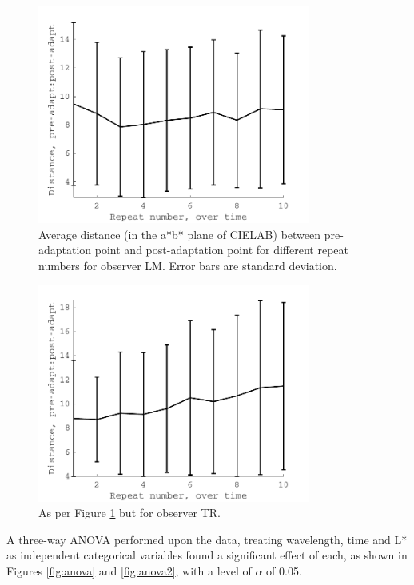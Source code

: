 \begin{figure}[htbp]
\includegraphics[max width=0.8\textwidth]{figs/LargeSphere/LMCCI_T.pdf}
\caption{Average distance (in the a*b* plane of CIELAB) between pre-adaptation point and post-adaptation point for different repeat numbers for observer LM. Error bars are standard deviation.}
\label{fig:LMCCI_T}
\end{figure}

\begin{figure}[htbp]
\includegraphics[max width=0.8\textwidth]{figs/LargeSphere/TRCCI_T.pdf}
\caption{As per Figure \ref{fig:LMCCI_T} but for observer TR.}
\label{fig:TRCCI_T}
\end{figure}

A three-way ANOVA performed upon the data, treating wavelength, time and L* as independent categorical variables found a significant effect of each, as shown in Figures \ref{fig:anova} and \ref{fig:anova2}, with a level of $\alpha$ of 0.05.

